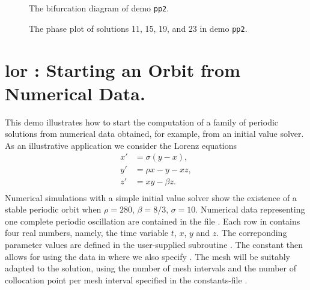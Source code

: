 \documentclass[12pt]{report}
\begin{document}
\begin{figure}[p]
\epsfysize 9.0cm
\centerline{}
\caption{The bifurcation diagram of demo {\tt pp2}.}
\label{fig:pp2_1}
\end{figure}

\begin{figure}[p]
\epsfysize 9.0cm
\centerline{}
\caption{The phase plot of solutions 11, 15, 19, and 23 in demo {\tt pp2}.}
\label{fig:pp2_2}
\end{figure}


\newpage
\section{ lor : Starting an Orbit from Numerical Data.} \label{sec:Demos_lor}
This demo illustrates how to start the computation of a family of
periodic solutions from numerical data obtained, for example, from an
initial value solver.
As an illustrative application we consider the Lorenz equations
\begin{equation} \begin{array}{cl}
  x' &=  \sigma (y - x), \\
  y' &=  \rho x - y - x z,  \\
  z' &=  x y - \beta z. \\\end{array} \end{equation}
Numerical simulations with a simple initial value solver show the
existence of a stable periodic orbit when $\rho=280$, $\beta=8/3$, $\sigma=10$.
Numerical data representing one complete periodic oscillation are
contained in the file . 
Each row in  contains four real numbers, namely,
the time variable $t$, $x$, $y$ and $z$.
The correponding parameter values are defined in the user-supplied subroutine
.
The \AUTO constant  then allows for using
the data in  where we also specify .
The mesh will be suitably adapted to the solution, using the number of
mesh intervals  and the number of collocation point per mesh
interval  specified in the constants-file .
\end{document}
